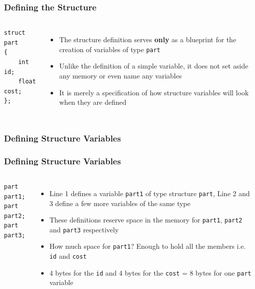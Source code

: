 \documentclass{beamer}
\begin{document}
\begin{frame}[fragile]
    \frametitle{Defining the Structure}
    \begin{columns}
        \lstset{style=mystyle}
\begin{lstlisting}
struct part
{
    int id;
    float cost;
};
\end{lstlisting}
            \begin{itemize}
            \item The structure definition serves \textbf{only} as a blueprint for the creation of variables of type \texttt{part}
            \item Unlike the definition of a simple variable, it does not set aside any memory or even name any variables
            \item It is merely a specification of how structure variables will look when they are defined
            \end{itemize}
    \end{columns}
\end{frame}

\begin{frame}[fragile]
    \frametitle{Defining Structure Variables}
    \subsubsection{Defining Structure Variables} %
    \label{ssub:defining_structure_variables}
    \begin{columns}
        \lstset{style=mystyle}
\begin{lstlisting}
part part1;
part part2;
part part3;
\end{lstlisting}
            \begin{itemize}
            \item Line 1 defines a variable \texttt{part1} of type structure \texttt{part}, Line 2 and 3 define a few more variables of the same type
            \item These definitions reserve space in the memory for \texttt{part1}, \texttt{part2} and \texttt{part3} respectively
            \item How much space for \texttt{part1}? Enough to hold all the members i.e. \texttt{id} and \texttt{cost}
            \item 4 bytes for the \texttt{id} and 4 bytes for the \texttt{cost} = 8 bytes for one \texttt{part} variable
            \end{itemize}
    \end{columns}
\end{frame}
\end{document}

